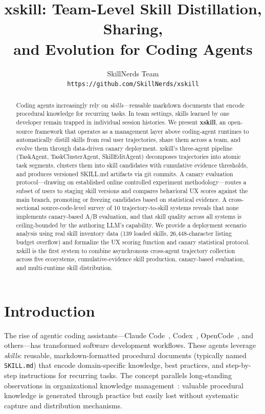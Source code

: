 \documentclass{article}
\title{xskill: Team-Level Skill Distillation, Sharing,\\ and Evolution for Coding Agents}
\author{
  SkillNerds Team \\
  \texttt{https://github.com/SkillNerds/xskill}
}
\begin{document}
\maketitle

\begin{abstract}
Coding agents increasingly rely on \emph{skills}---reusable markdown documents that encode procedural knowledge for recurring tasks. In team settings, skills learned by one developer remain trapped in individual session histories. We present \textbf{xskill}, an open-source framework that operates as a management layer above coding-agent runtimes to automatically distill skills from real user trajectories, share them across a team, and evolve them through data-driven canary deployment. xskill's three-agent pipeline (TaskAgent, TaskClusterAgent, SkillEditAgent) decomposes trajectories into atomic task segments, clusters them into skill candidates with cumulative evidence thresholds, and produces versioned SKILL.md artifacts via git commits. A canary evaluation protocol---drawing on established online controlled experiment methodology---routes a subset of users to staging skill versions and compares behavioral UX scores against the main branch, promoting or freezing candidates based on statistical evidence. A cross-sectional source-code-level survey of 10 trajectory-to-skill systems reveals that none implements canary-based A/B evaluation, and that skill quality across all systems is ceiling-bounded by the authoring LLM's capability. We provide a deployment scenario analysis using real skill inventory data (139 loaded skills, 26{,}448-character listing budget overflow) and formalize the UX scoring function and canary statistical protocol. xskill is the first system to combine asynchronous cross-agent trajectory collection across five ecosystems, cumulative-evidence skill production, canary-based evaluation, and multi-runtime skill distribution.
\end{abstract}

\section{Introduction}
\label{sec:intro}

The rise of agentic coding assistants---Claude Code~\citep{anthropic2025claude}, Codex~\citep{openai2025codex}, OpenCode~\citep{sst2025opencode}, and others---has transformed software development workflows. These agents leverage \emph{skills}: reusable, markdown-formatted procedural documents (typically named \texttt{SKILL.md}) that encode domain-specific knowledge, best practices, and step-by-step instructions for recurring tasks. The concept parallels long-standing observations in organizational knowledge management~\citep{nonaka1995knowledge}: valuable procedural knowledge is generated through practice but easily lost without systematic capture and distribution mechanisms.
\end{document}
